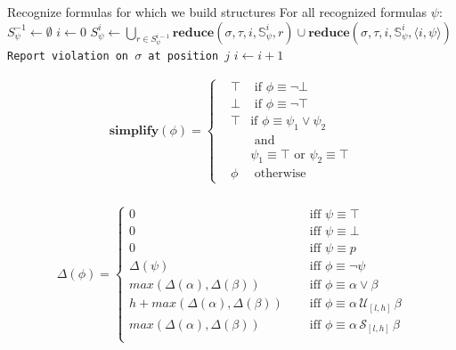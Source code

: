 \documentclass[10pt,a4paper]{article}
\newcommand{\rp}[2]{\ensuremath{\langle #1, #2 \rangle}}
\begin{document}
\begin{algorithmic}[1]
\STATE Recognize formulas for which we build structures
\STATE For all recognized formulas $\psi$: $S^{-1}_{\psi} \leftarrow \emptyset$
\STATE $i \leftarrow 0$
\LOOP
{}
	\STATE $S^i_{\psi} \leftarrow \bigcup\limits_{r \in S^{i-1}_{\psi}} \mathbf{reduce}(\sigma, \tau, i, \mathbb{S}^i_{\psi}, r) \cup \mathbf{reduce}(\sigma, \tau, i, \mathbb{S}^i_{\psi}, \rp{i}{\psi})$
\ENDFOR
\FOR{all $\rp{j}{\bot} \in S^i_{\varphi}$}
\STATE \texttt{Report violation on $\sigma$ at position $j$}
\ENDFOR
\STATE $i \leftarrow i + 1$
\ENDLOOP
\end{algorithmic}


\begin{align*}
\mathbf{simplify}(\phi) = \left\{
\begin{aligned}
&\top &\text{ if } \phi \equiv \neg \bot \\
&\bot &\text{ if } \phi \equiv \neg \top \\
&\top &\text {if } \phi \equiv \psi_1 \vee \psi_2 \\
& &\text{ and } \\ & & \psi_1 \equiv \top \text{ or } \psi_2 \equiv \top \\
&\phi &\text{ otherwise}
\end{aligned} \right. \\
\end{align*}




\begin{align*}
\Delta(\phi) = \left\lbrace
\begin{aligned}
0 & \quad \text{ iff } \psi \equiv \top \\
0 & \quad \text{ iff } \psi \equiv \bot \\
0 & \quad \text{ iff } \psi \equiv p \\
\Delta(\psi) & \quad \text{ iff } \phi \equiv \neg \psi \\
max(\Delta(\alpha),\Delta(\beta)) & \quad \text{ iff } \phi \equiv \alpha \vee \beta \\
h + max(\Delta(\alpha),\Delta(\beta)) & \quad \text{ iff } \phi \equiv \alpha\, \mathcal{U}_{[l,h]}\, \beta \\
max(\Delta(\alpha),\Delta(\beta)) & \quad \text{ iff } \phi \equiv \alpha\, \mathcal{S}_{[l,h]}\, \beta \\
\end{aligned} \right. 
\end{align*}
\end{document}
